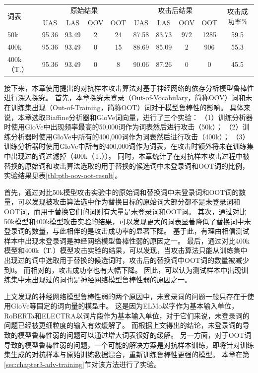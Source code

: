 \begin{table}[ht]
    \vspace{0.5em}\centering\wuhao
	\begin{tabular}{lccccccccc}
		\toprule[1.5pt]
		\multirow{2}{*}{词表}& \multicolumn{4}{c}{原始结果} & \multicolumn{4}{c}{攻击后结果} & \multirow{2}{*}{攻击成功率\%} \\
		\cmidrule(r){2-5} \cmidrule(r){6-9}
		&UAS &LAS &OOV &OOT &UAS &LAS &OOV &OOT \\
		\midrule[1pt]
		50k  &95.36 &93.49 &2  &24 &87.58 &83.73 &972 &1285 &59.5 \\
		400k &95.36 &93.49 &0  &15 &88.69 &85.09 &2       &906  &55.3 \\
		400k（T.） &95.36 &93.49 &0  &8  &90.06 &87.26 &0 &0 &45.5 \\
		\bottomrule[1.5pt]
	\end{tabular}
\end{table}


接下来，本章使用提出的对抗样本攻击算法对基于神经网络的依存分析模型鲁棒性进行深入探究。
首先，本章探究未登录（Out-of-Vocabulary，简称OOV）词和未在训练集出现（Out-of-Training，简称OOT）词对于模型鲁棒性的影响。
具体来说，本章选取Biaffine分析器和GloVe词向量，进行了三个实验：
（1）训练分析器时使用GloVe中出现频率最高的50,000词作为词表然后进行攻击（50k）；
（2）训练分析器时使用GloVe中所有的400,000词作为词表然后进行攻击（400k）；
（3）训练分析器时使用GloVe中所有的400,000词作为词表，在攻击时额外将未在训练集中出现过的词过滤掉（400k（T.））。
同时，本章统计了在对抗样本攻击过程中被替换的原始词和攻击算法选取的用于替换的候选词中未登录词和OOT词的比例，实验结果见表\ref{tbl:ptb-oov-oot-result}。

首先，通过对比50k模型攻击实验中的原始词和替换词中未登录词和OOT词的数量，可以发现被攻击算法选中作为替换目标的原始词大部分都不是未登录词和OOT词，而用于替换它们的词则有大量是未登录词和OOT词。
其次，通过对比50k模型和400k模型攻击实验的结果，可以发现更大的词表显著降低了替换词中未登录词的数量，与此相伴的是攻击成功率的显著下降。
基于此，有理由相信测试样本中出现未登录词是神经网络模型鲁棒性弱的原因之一。
最后，通过对比400k模型和400k（T.）模型攻击实验的结果，可以发现，当攻击算法只能从训练集中出现过的词中选取用于替换的候选词时，攻击后的替换词中OOT词的数量被减少到0。
而相对的，攻击成功率也有大幅下降。
因此，可以认为测试样本中出现训练集中未出现过的词也是神经网络模型鲁棒性弱的原因之一。

上文发现的神经网络模型鲁棒性弱的两个原因中，未登录词的问题一般只存在于使用GloVe等固定的词向量的模型中。
这是因为ELMo以字作为基本输入单位，RoBERTa和ELECTRA以词片段作为基本输入单位，对于它们来说，未登录词的问题已经被更细粒度的输入有效缓解了。
而根据上文得出的结论，未登录词的导致的模型鲁棒性弱的问题可以通过增大词表很好的缓解。
另一方面，对于OOT词导致的模型鲁棒性弱的问题，一个可能的解决方案是对抗样本训练，即将针对训练集生成的对抗样本与原始训练数据混合，重新训练鲁棒性更强的模型。
本章在第\ref{sec:chapter3-adv-training}节对该方法进行了实验。

